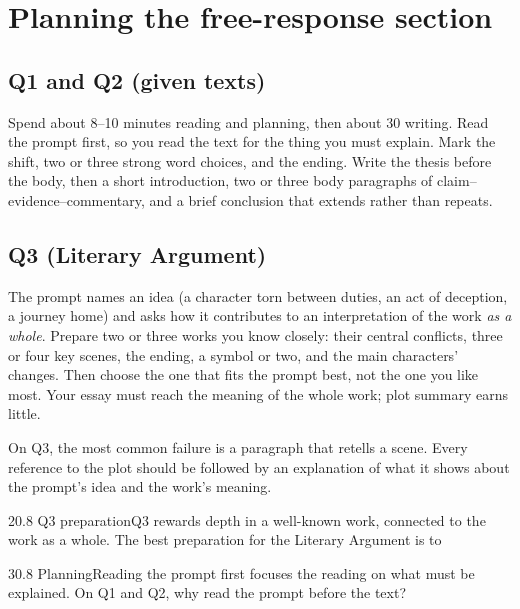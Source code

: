 \documentclass[11pt]{article}
\begin{document}
\section{Planning the free-response section}
\label{sec:8}

\subsection{Q1 and Q2 (given texts)}
Spend about 8--10 minutes reading and planning, then about 30 writing. Read the prompt first, so you read the text for the thing you must explain. Mark the shift, two or three strong word choices, and the ending. Write the thesis before the body, then a short introduction, two or three body paragraphs of claim--evidence--commentary, and a brief conclusion that extends rather than repeats.

\subsection{Q3 (Literary Argument)}
The prompt names an idea (a character torn between duties, an act of deception, a journey home) and asks how it contributes to an interpretation of the work \emph{as a whole}. Prepare two or three works you know closely: their central conflicts, three or four key scenes, the ending, a symbol or two, and the main characters' changes. Then choose the one that fits the prompt best, not the one you like most. Your essay must reach the meaning of the whole work; plot summary earns little.

\begin{trap}
On Q3, the most common failure is a paragraph that retells a scene. Every reference to the plot should be followed by an explanation of what it shows about the prompt's idea and the work's meaning.
\end{trap}

\begin{q}{2}{0.8 Q3 preparation}{Q3 rewards depth in a well-known work, connected to the work as a whole.}
The best preparation for the Literary Argument is to
\end{q}

\begin{q}{3}{0.8 Planning}{Reading the prompt first focuses the reading on what must be explained.}
On Q1 and Q2, why read the prompt before the text?
\end{q}

\makekey
\end{document}
